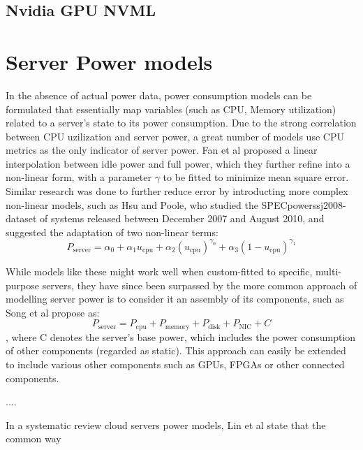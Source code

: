 \subsection{Nvidia GPU NVML}


\section{Server Power models}
In the absence of actual power data, power consumption models can be formulated that essentially map variables (such as CPU, Memory utilization) related to a server's state to its power consumption. 
Due to the strong correlation between CPU uzilization and server power, a great number of models use CPU metrics as the only indicator of server power. Fan et al\parencite{fan2007power} proposed a linear interpolation between idle power and full power, which they further refine into a non-linear form, with a parameter $\gamma$ to be fitted to minimize mean square error. Similar research was done to further reduce error by introducting more complex non-linear models, such as Hsu and Poole\parencite{hsu2011power}, who studied the SPECpower\textunderscore ssj2008-dataset of systems released between December 2007 and August 2010, and suggested the adaptation of two non-linear terms:
\begin{equation}
    P_{\text{server}} = \alpha_0 + \alpha_1 u_{\text{cpu}} + \alpha_2 \left( u_{\text{cpu}} \right)^{\gamma_0} + \alpha_3 \left( 1 - u_{\text{cpu}} \right)^{\gamma_1}
\end{equation}

While models like these might work well when custom-fitted to specific, multi-purpose servers, they have since been surpassed by the more common approach of modelling server power is to consider it an assembly of its components, such as Song et al\parencite{song2013unified} propose as:
\begin{equation}
    P_{\text{server}} = P_{\text{cpu}} + P_{\text{memory}} + P_{\text{disk}} + P_{\text{NIC}} + C
\end{equation}
, where C denotes the server's base power, which includes the power consumption of other components (regarded as static). This approach can easily be extended to include various other components such as GPUs, FPGAs or other connected components.


....




In a systematic review cloud servers power models, Lin et al\parencite{lin2020taxonomy} state that the common way


